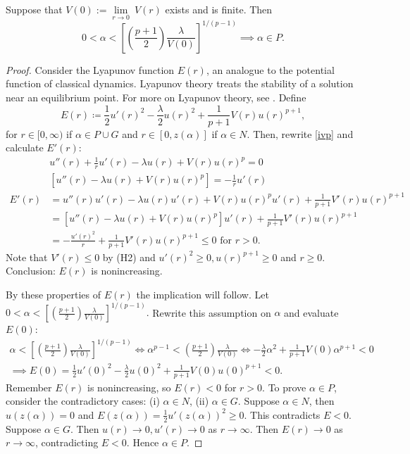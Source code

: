 \newpage
\begin{lemma}\label{lya}Suppose that $V(0):=\underset{r\to0}{\lim}~V(r)$ exists and is finite. Then $$0<\alpha<\left[\left(\frac{p+1}{2}\right)\frac{\lambda}{V(0)} \right]^{1/(p-1)}\implies \alpha\in P.$$
\begin{proof}
Consider the Lyapunov function $E(r)$, an analogue to the potential function of classical dynamics. Lyapunov theory treats the stability of a solution near an equilibrium point. For more on Lyapunov theory, see \cite{}. Define $$E(r)\coloneqq\frac{1}{2}u'(r)^2-\frac{\lambda}{2}u(r)^2+\frac{1}{p+1}V(r)u(r)^{p+1},$$  for $r\in[0,\infty)$ if $\alpha\in P\cup G$ and $r\in[0,z(\alpha)]$ if $\alpha\in N$. Then, rewrite \ref{ivp} and calculate $E'(r)$: \begin{align*} &u''(r)+\frac{1}{r}u'(r)-\lambda u(r)+V(r)u(r)^p=0\\
&\left[u''(r)-\lambda u(r)+V(r)u(r)^p\right]=-\frac{1}{r}u'(r)\\
E'(r)&=u''(r)u'(r)-\lambda u(r)u'(r)+V(r)u(r)^pu'(r)+\frac{1}{p+1}V'(r)u(r)^{p+1}\\
&=\left[u''(r)-\lambda u(r)+V(r)u(r)^p\right]u'(r)+\frac{1}{p+1}V'(r)u(r)^{p+1}\\
&=-\frac{u'(r)^2}{r}+\frac{1}{p+1}V'(r)u(r)^{p+1}\leq0\text{ for }r>0.
\end{align*} Note that $V'(r)\leq0$ by (H2) and $u'(r)^2\geq0, u(r)^{p+1}\geq0$ and $r\geq0$. Conclusion: $E(r)$ is nonincreasing.

By these properties of $E(r)$ the implication will follow. Let $0<\alpha<\left[\left(\frac{p+1}{2}\right)\frac{\lambda}{V(0)} \right]^{1/(p-1)}.$ Rewrite this assumption on $\alpha$ and evaluate $E(0)$: \begin{gather*}\alpha<\left[\left(\frac{p+1}{2}\right)\frac{\lambda}{V(0)} \right]^{1/(p-1)}\iff\alpha^{p-1}<\left(\frac{p+1}{2}\right)\frac{\lambda}{V(0)}\iff
-\frac{\lambda}{2}\alpha^2+\frac{1}{p+1}V(0)\alpha^{p+1}<0\\\implies E(0)=\frac{1}{2}u'(0)^2-\frac{\lambda}{2}u(0)^2+\frac{1}{p+1}V(0)u(0)^{p+1}<0.\end{gather*} Remember $E(r)$ is nonincreasing, so $E(r)<0$ for $r>0$. To prove $\alpha\in P$, consider the contradictory cases: (i) $\alpha\in N$, (ii) $\alpha\in G$. Suppose $\alpha\in N$, then $u(z(\alpha))=0$ and $E(z(\alpha))=\frac{1}{2}u'(z(\alpha))^2\geq0$. This contradicts $E<0$. Suppose $\alpha\in G$. Then $u(r)\to0,u'(r)\to0$ as $r\to\infty$. Then $E(r)\to0$ as $r\to\infty$, contradicting $E<0$. Hence $\alpha\in P$.
\end{proof}
\end{lemma}
